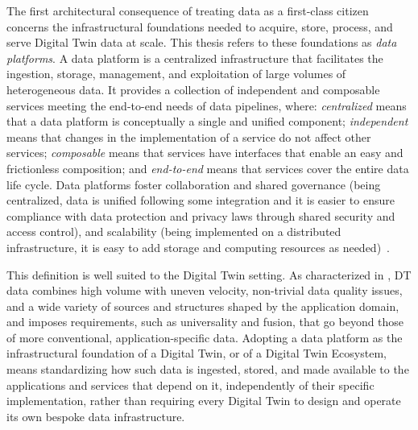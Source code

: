 The first architectural consequence of treating data as a first-class citizen concerns the infrastructural foundations needed to acquire, store, process, and serve Digital Twin data at scale. This thesis refers to these foundations as \textit{data platforms}. A data platform is a centralized infrastructure that facilitates the ingestion, storage, management, and exploitation of large volumes of heterogeneous data.
It provides a collection of independent and composable services meeting the end-to-end needs of data pipelines, where:
\textit{centralized} means that a data platform is conceptually a single and unified component;
\textit{independent} means that changes in the implementation of a service do not affect other services;
\textit{composable} means that services have interfaces that enable an easy and frictionless composition;
and \textit{end-to-end} means that services cover the entire data life cycle.
Data platforms foster collaboration and shared governance (being centralized, data is unified following some integration and it is easier to ensure compliance with data protection and privacy laws through shared security and access control), and scalability (being implemented on a distributed infrastructure, it is easy to add storage and computing resources as needed)~\cite{francia2025process}. 


This definition is well suited to the Digital Twin setting. As characterized in , DT data combines high volume with uneven velocity, non-trivial data quality issues, and a wide variety of sources and structures shaped by the application domain, and imposes requirements, such as universality and fusion, that go beyond those of more conventional, application-specific data. Adopting a data platform as the infrastructural foundation of a Digital Twin, or of a Digital Twin Ecosystem, means standardizing how such data is ingested, stored, and made available to the applications and services that depend on it, independently of their specific implementation, rather than requiring every Digital Twin to design and operate its own bespoke data infrastructure.

